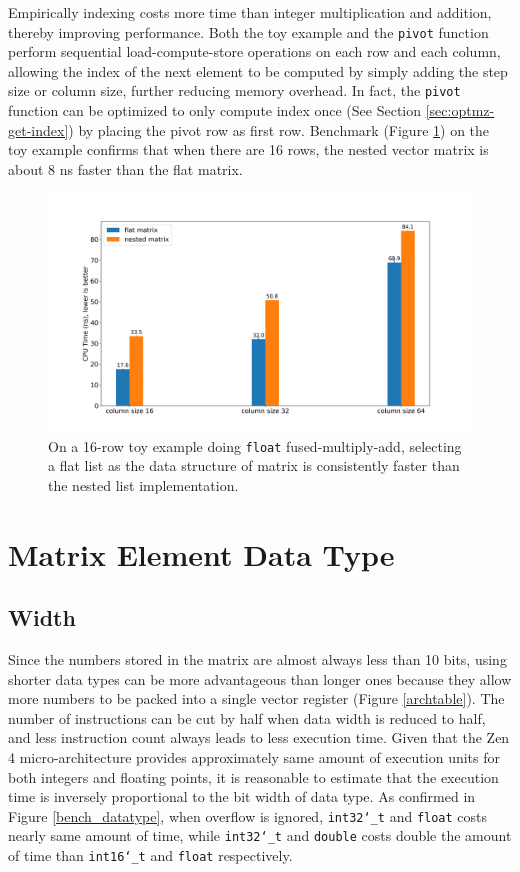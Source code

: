 \documentclass[logo,bsc,singlespacing,parskip]{infthesis}
\newcommand{\dtshort}{\texttt{int16\char`_t}}
\newcommand{\dtint}{\texttt{int32\char`_t}}
\newcommand{\dtfloat}{\texttt{float}}
\newcommand{\dtdouble}{\texttt{double}}
\newcommand{\pivot}{\texttt{pivot}}
\begin{document}
Empirically indexing costs more time than integer multiplication and addition,
thereby improving performance. Both the toy example and the \pivot{} function
perform sequential load-compute-store operations on each row and each column,
allowing the index of the next element to be computed by simply adding the step
size or column size, further reducing memory overhead. In fact, the \pivot{}
function can be optimized to only compute index once (See Section
\ref{sec:optmz-get-index}) by placing the pivot row as first row. Benchmark
(Figure \ref{fig:nested-flat}) on the toy example confirms that when there are
16 rows, the nested vector matrix is about 8 ns faster than the flat matrix.

\begin{figure}
    \includegraphics[width=\linewidth]{image/bench_nested_flat.png}
\caption{On a 16-row toy example doing \dtfloat{} fused-multiply-add, selecting
a flat list as the data structure of matrix is consistently faster than the
nested list implementation.  }
    \label{fig:nested-flat}
\end{figure}


\section{Matrix Element Data Type}


\subsection{Width}
\label{sec:width} 
Since the numbers stored in the matrix are almost always less than 10 bits,
using shorter data types can be more advantageous than longer ones because they
allow more numbers to be packed into a single vector register (Figure
\ref{archtable}). The number of instructions can be cut by half when data width
is reduced to half, and less instruction count always leads to less execution
time. Given that the Zen 4 micro-architecture provides approximately same amount
of execution units for both integers and floating points, it is reasonable to
estimate that the execution time is inversely proportional to the bit width of
data type. As confirmed in Figure \ref{bench_datatype}, when overflow is
ignored, \dtint{} and \dtfloat{} costs nearly same amount of time, while
\dtint{} and \dtdouble{} costs double the amount of time than \dtshort{} and
\dtfloat{} respectively.
\end{document}
